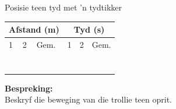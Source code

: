 \begin{f_experiment}{Posisie teen tyd met  'n tydtikker}
\begin{table}[H]
\begin{center}
      \label{m38795*id7141349}
      \begin{tabular}{|l|l|l|l|l|l|}\hline
    \multicolumn{3}{|c|}{Afstand (m)}
     &
    \multicolumn{3}{c|}{Tyd (s)}
     \\ \hline
        1 &
        2 &
        Gem. &
        1 &
        2 &
        Gem. \\ \hline
         &
         &
         &
         &
         &
      \\ \hline
         &
         &
         &
         &
         &
       \\ \hline
         &
         &
         &
         &
         &
       \\ \hline
         &
         &
         &
         &
         &
        \\ \hline
         &
         &
         &
         &
         &
        \\ \hline
         &
         &
         &
         &
         &
       \\ \hline
         &
         &
         &
         &
         &
      \\ \hline
    \end{tabular}
      \end{center}
\end{table}
    \par
\textbf{Bespreking:}\\
Beskryf die beweging van die trollie teen oprit.
\end{f_experiment}

